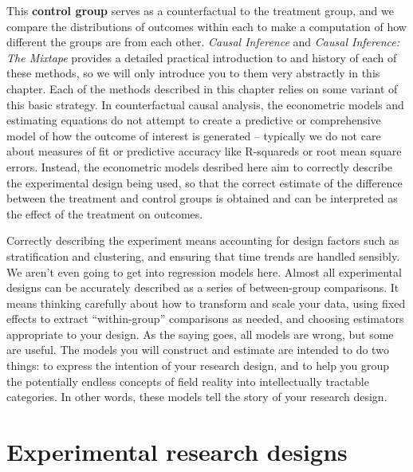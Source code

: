 This \textbf{control group} serves as a counterfactual to the treatment group,
and we compare the distributions of outcomes within each
to make a computation of how different the groups are from each other.
\textit{Causal Inference} and \textit{Causal Inference: The Mixtape}
provides a detailed practical introduction to and history of
each of these methods, so we will only introduce you to
them very abstractly in this chapter.
Each of the methods described in this chapter
relies on some variant of this basic strategy.
In counterfactual causal analysis,
the econometric models and estimating equations
do not attempt to create a predictive or comprehensive model
of how the outcome of interest is generated --
typically we do not care about measures of fit or predictive accuracy
like R-squareds or root mean square errors.
Instead, the econometric models desribed here aim to
correctly describe the experimental design being used,
so that the correct estimate of the difference
between the treatment and control groups is obtained
and can be interpreted as the effect of the treatment on outcomes.

Correctly describing the experiment means accounting for design factors
such as stratification and clustering, and
ensuring that time trends are handled sensibly.
We aren't even going to get into regression models here.
Almost all experimental designs can be accurately described
as a series of between-group comparisons.
It means thinking carefully about how to transform and scale your data,
using fixed effects to extract ``within-group'' comparisons as needed,
and choosing estimators appropriate to your design.
As the saying goes, all models are wrong, but some are useful.
The models you will construct and estimate are intended to do two things:
to express the intention of your research design,
and to help you group the potentially endless concepts of field reality
into intellectually tractable categories.
In other words, these models tell the story of your research design.


\section{Experimental research designs}

